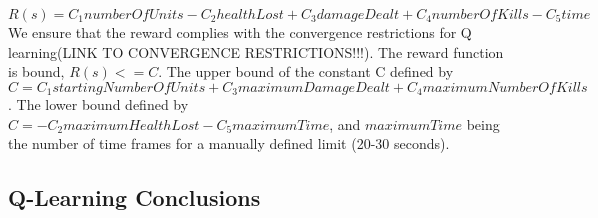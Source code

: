 $R(s) = C_1 numberOfUnits  -  C_2 healthLost  +   C_3 damageDealt  +   C_4 numberOfKills -  C_5 time$ \\ 

We ensure that the reward complies with the convergence restrictions for Q learning(LINK TO CONVERGENCE RESTRICTIONS!!!). The reward function is bound, $R(s) <= C$. The upper bound of the constant C defined by $C = C_1 startingNumberOfUnits  +   C_3 maximumDamageDealt  +   C_4 maximumNumberOfKills$. The lower bound defined by $C = -  C_2 maximumHealthLost -  C_5 maximumTime$, and $maximumTime$ being the number of time frames for a manually defined limit (20-30 seconds). 

\subsection{Q-Learning Conclusions}
